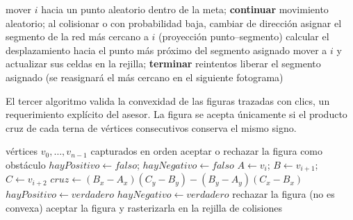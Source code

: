 \documentclass[12pt,a4paper]{article}
\begin{document}
\begin{algorithm}[H]
\caption{Movimiento de individuos con evasión de colisiones.}
\begin{algorithmic}[1]
        \State mover $i$ hacia un punto aleatorio dentro de la meta; \textbf{continuar}
    \EndIf
        \State movimiento aleatorio; al colisionar o con probabilidad baja, cambiar de direcci\'on
    \Else
            \State asignar el segmento de la red m\'as cercano a $i$ (proyecci\'on punto--segmento)
        \EndIf
        \State calcular el desplazamiento hacia el punto m\'as pr\'oximo del segmento asignado
                \State mover a $i$ y actualizar sus celdas en la rejilla; \textbf{terminar} reintentos
            \EndIf
        \EndFor
            \State liberar el segmento asignado (se reasignar\'a el m\'as cercano en el siguiente fotograma)
        \EndIf
    \EndIf
\EndFor
\end{algorithmic}
\end{algorithm}

El tercer algoritmo valida la convexidad de las figuras trazadas con clics, un requerimiento explícito del asesor. La figura se acepta únicamente si el producto cruz de cada terna de vértices consecutivos conserva el mismo signo.

\begin{algorithm}[H]
\caption{Validación de convexidad de un obstáculo trazado con clics.}
\begin{algorithmic}[1]
\Require vértices $v_0, \dots, v_{n-1}$ capturados en orden
\Ensure aceptar o rechazar la figura como obstáculo
\State $hayPositivo \gets falso$; $hayNegativo \gets falso$
    \State $A \gets v_i$; $B \gets v_{i+1}$; $C \gets v_{i+2}$ 
    \State $cruz \gets (B_x-A_x)(C_y-B_y) - (B_y-A_y)(C_x-B_x)$
     \State $hayPositivo \gets verdadero$
     \State $hayNegativo \gets verdadero$ \EndIf
\EndFor
{}
    \State rechazar la figura (no es convexa)
\Else
    \State aceptar la figura y rasterizarla en la rejilla de colisiones
\EndIf
\end{algorithmic}
\end{algorithm}
\end{document}
